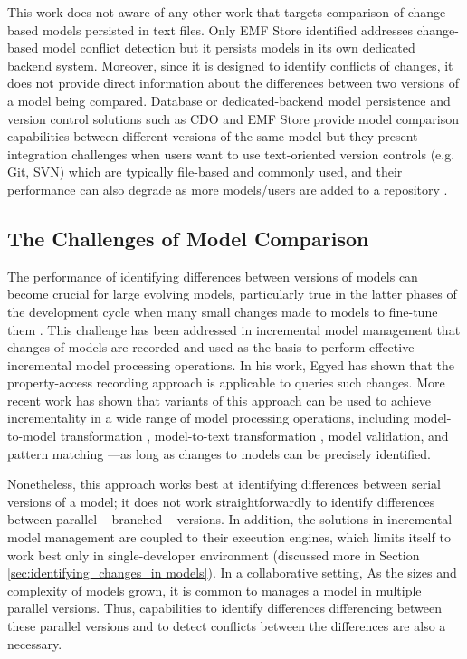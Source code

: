 This work does not aware of any other work that targets comparison of change-based models persisted in text files. Only EMF Store \cite{koegel2010emfstore} identified addresses change-based model conflict detection but it persists models in its own dedicated backend system. Moreover, since it is designed to identify conflicts of changes, it does not provide direct information about the differences between two versions of a model being compared. Database or dedicated-backend model persistence and version control solutions such as CDO \cite{eclipse2019cdo} and EMF Store provide model comparison capabilities between different versions of the same model but they present integration challenges when users want to use text-oriented version controls (e.g. Git, SVN) which are typically file-based and commonly used, and their performance can also degrade as more models/users are added to a repository \cite{KolovosRMPGCLRV13}. 

\subsection{The Challenges of Model Comparison}
\label{sec:the_key_challenge_of_incrementality}

The performance of identifying differences between versions of models can become crucial for large evolving models, particularly true in the latter phases of the development cycle when many small changes made to models to fine-tune them \cite{selic2003pragmatics}. This challenge has been addressed in incremental model management that changes of models are recorded and used as the basis to perform effective incremental model processing operations. In his work, Egyed \cite{egyed2011automatically} has shown that the property-access recording approach is applicable to queries such changes. More recent work has shown that variants of this approach can be used to achieve incrementality in a wide range of model processing operations, including model-to-model transformation \cite{jouault2010towards}, model-to-text transformation \cite{DBLP:conf/ecmdafa/OgunyomiRK15}, model validation, and pattern matching \cite{DBLP:conf/ecmdafa/RathHV12}---as long as changes to models can be precisely identified.  

Nonetheless, this approach works best at identifying differences between serial versions of a model; it does not work straightforwardly to identify differences between parallel -- branched -- versions. In addition, the solutions in incremental model management are coupled to their execution engines, which limits itself to work best only in single-developer environment (discussed more in Section \ref{sec:identifying_changes_in models}). In a collaborative setting, As the sizes and complexity of models grown, it is common to manages a model in multiple parallel versions. Thus, capabilities to identify differences differencing between these parallel versions and to detect conflicts between the differences are also a necessary.

